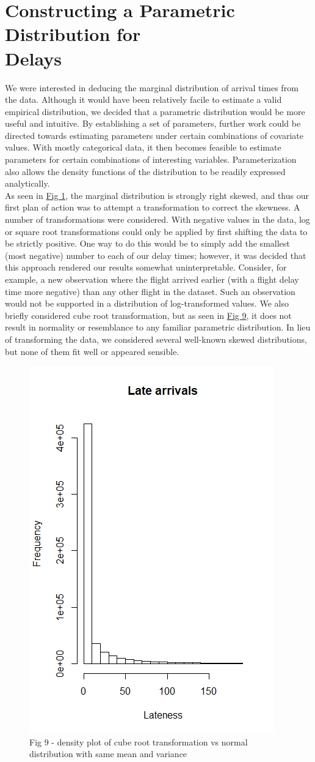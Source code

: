 \documentclass[12pt, a4paper, openany]{book}
\newcommand\tab[1][1cm]{\hspace*{#1}}
\begin{document}
	\section{Constructing a Parametric Distribution for \\Delays}
	 \tab We were interested in deducing the marginal distribution of arrival times from the data. Although it would have been relatively facile to estimate a valid empirical distribution, we decided that a parametric distribution would be more useful and intuitive. By establishing a set of parameters, further work could be directed towards estimating parameters under certain combinations of covariate values. With mostly categorical data, it then becomes feasible to estimate parameters for certain combinations of interesting variables. Parameterization also allows the density functions of the distribution to be readily expressed analytically.\\
	\tab As seen in \underline{Fig 1}, the marginal distribution is strongly right skewed, and thus our first plan of action was to attempt a transformation to correct the skewness. A number of transformations were considered. With negative values in the data, log or square root transformations could only be applied by first shifting the data to be strictly positive. One way to do this would be to simply add the smallest (most negative) number to each of our delay times; however, it was decided that this approach rendered our results somewhat uninterpretable. Consider, for example, a new observation where the flight arrived earlier (with a flight delay time more negative) than any other flight in the dataset. Such an observation would not be supported in a distribution of log-transformed values. We also briefly considered cube root transformation, but as seen in \underline{Fig 9}, it does not result in normality or resemblance to any familiar parametric distribution. In lieu of transforming the data, we considered several well-known skewed distributions, but none of them fit well or appeared sensible.\\
			\begin{figure}
			\centering
	 		\includegraphics[width = .35 \textwidth]{../figures/LateArrivalsHistogram}
	 		\caption{Fig 9 - density plot of cube root transformation vs normal distribution with same mean and variance}
	 		\end{figure}
\end{document}
